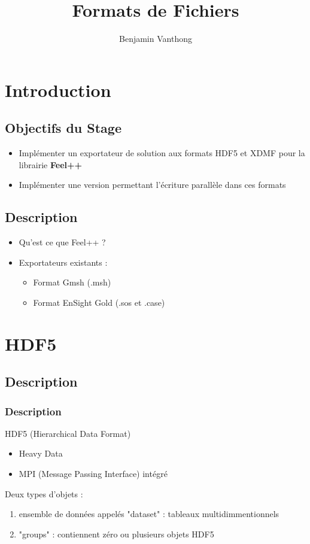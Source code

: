 \documentclass{beamer}
\title{Formats de Fichiers}
\author{Benjamin Vanthong}
\institute{Université de Strasbourg}
\begin{document}
\begin{frame}
\titlepage
\end{frame}

\section{Introduction}
\subsection {Objectifs du Stage}
\begin{frame}
\begin{itemize}
\item Implémenter un exportateur de solution aux formats HDF5 et XDMF pour la librairie \textbf{Feel++}
\item Implémenter une version permettant l'écriture parallèle dans ces formats
\end{itemize}
\end{frame}
\subsection{Description}
\begin{frame}
\begin{itemize}
\item Qu'est ce que Feel++ ?
\item Exportateurs existants :
\begin{itemize}
\item Format Gmsh (.msh)
\item Format EnSight Gold (.sos et .case)
\end{itemize}
\end{itemize}
\end{frame}

\begin{frame}
\tableofcontents[hideallsubsections]
\end{frame}
\section{HDF5}
\subsection{Description}
\begin{frame}
\frametitle {Description}
HDF5 (Hierarchical Data Format)
\begin{itemize}
\item Heavy Data
\item MPI (Message Passing Interface) intégré
\end{itemize}
Deux types d'objets :
\begin{enumerate}
\item ensemble de données appelés "dataset" : tableaux multidimmentionnels
\item "groups" : contiennent zéro ou plusieurs objets HDF5
\end{enumerate}
\end{frame}
\end{document}

